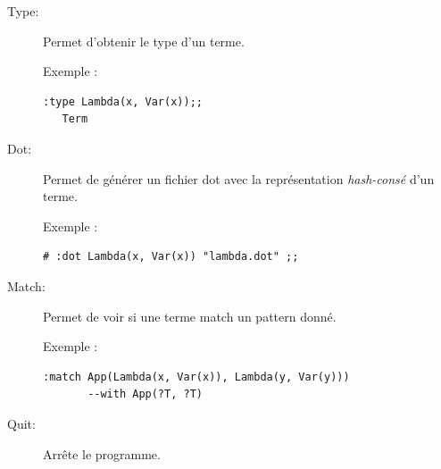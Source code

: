 \documentclass[12pt,a4paper]{article}
\begin{document}
\begin{description}
\item[Type:]
Permet d'obtenir le type d'un terme.\\

\begin{minipage}{\textwidth}
Exemple :
\begin{lstlisting}[basicstyle=\ttfamily\footnotesize]
  :type Lambda(x, Var(x));;
   Term
\end{lstlisting}
\end{minipage}

\item[Dot:]
Permet de générer un fichier dot avec la représentation \textit{hash-consé} d'un terme. \\

\begin{minipage}{\textwidth}
Exemple :
\begin{lstlisting}[basicstyle=\ttfamily\footnotesize]
  # :dot Lambda(x, Var(x)) "lambda.dot" ;;
\end{lstlisting}
\end{minipage}

\item[Match:]
Permet de voir si une terme match un pattern donné. \\

\begin{minipage}{\textwidth}
Exemple :
\begin{lstlisting}[basicstyle=\ttfamily\footnotesize]
:match App(Lambda(x, Var(x)), Lambda(y, Var(y))) 
       --with App(?T, ?T)
\end{lstlisting}
\end{minipage}

\item[Quit:]
Arrête le programme.

\end{description}
\end{document}
